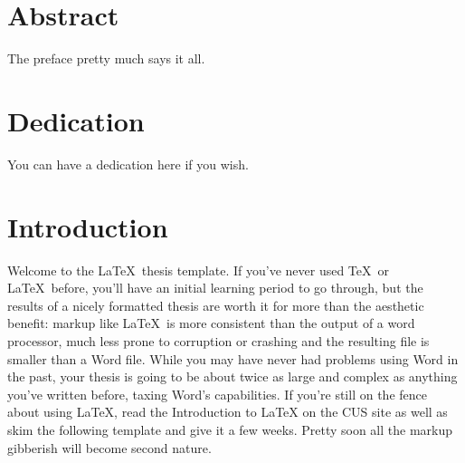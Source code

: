\documentclass[12pt,twoside]{reedthesis}
\begin{document}
    \tableofcontents
    \listoftables
    \listoffigures

    \chapter*{Abstract}
        The preface pretty much says it all.

        \chapter*{Dedication}
        You can have a dedication here if you wish.

  \mainmatter %
  \pagestyle{fancyplain} %


    \chapter*{Introduction}


        Welcome to the \LaTeX\ thesis template. If you've never used \TeX\ or \LaTeX\ before, you'll have an initial learning period to go through, but the results of a nicely formatted thesis are worth it for more than the aesthetic benefit: markup like \LaTeX\ is more consistent than the output of a word processor, much less prone to corruption or crashing and the resulting file is smaller than a Word file. While you may have never had problems using Word in the past, your thesis is going to be about twice as large and complex as anything you've written before, taxing Word's capabilities. If you're still on the fence about  using \LaTeX, read the Introduction to LaTeX on the CUS site as well as skim the following template and give it a few weeks. Pretty soon all the markup gibberish will become second nature.
\end{document}
